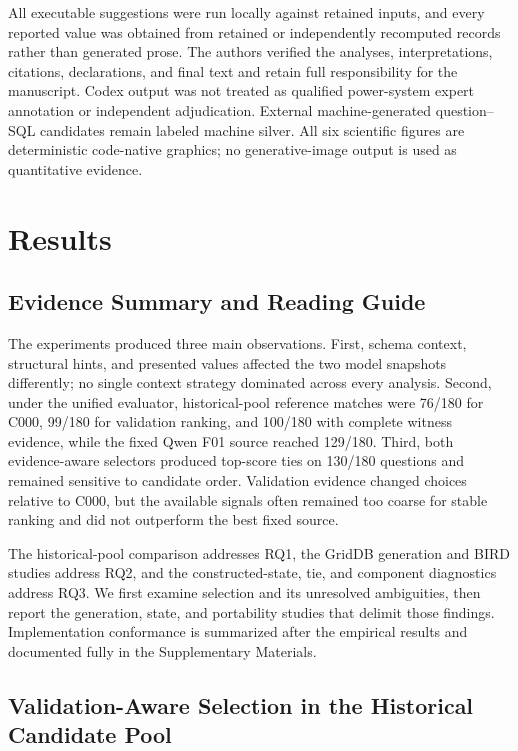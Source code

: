 \documentclass[information,article,submit,moreauthors]{Definitions/mdpi}
\begin{document}
All executable suggestions were run locally against retained inputs, and every reported value was obtained from retained or independently recomputed records rather than generated prose. The authors verified the analyses, interpretations, citations, declarations, and final text and retain full responsibility for the manuscript. Codex output was not treated as qualified power-system expert annotation or independent adjudication. External machine-generated question--SQL candidates remain labeled machine silver. All six scientific figures are deterministic code-native graphics; no generative-image output is used as quantitative evidence.

\section{Results}

\subsection{Evidence Summary and Reading Guide}

The experiments produced three main observations. First, schema context, structural hints, and presented values affected the two model snapshots differently; no single context strategy dominated across every analysis. Second, under the unified evaluator, historical-pool reference matches were 76/180 for C000, 99/180 for validation ranking, and 100/180 with complete witness evidence, while the fixed Qwen F01 source reached 129/180. Third, both evidence-aware selectors produced top-score ties on 130/180 questions and remained sensitive to candidate order. Validation evidence changed choices relative to C000, but the available signals often remained too coarse for stable ranking and did not outperform the best fixed source.

The historical-pool comparison addresses RQ1, the GridDB generation and BIRD studies address RQ2, and the constructed-state, tie, and component diagnostics address RQ3. We first examine selection and its unresolved ambiguities, then report the generation, state, and portability studies that delimit those findings. Implementation conformance is summarized after the empirical results and documented fully in the Supplementary Materials.

\subsection{Validation-Aware Selection in the Historical Candidate Pool}
\end{document}

